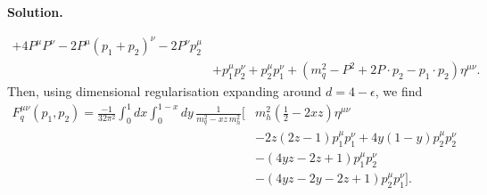 \documentclass[a4paper,11pt]{article}
\newenvironment{solution}{\par\medskip\noindent\textbf{Solution.}\par\smallskip}{\par\medskip}
\begin{document}
\begin{solution}
\begin{equation}
\begin{aligned}
+4P^\mu P^\nu
-2P^\mu(p_1+p_2)^\nu
-2P^\nu p_2^\mu
\\
&+p_1^\mu p_2^\nu+p_2^\mu p_1^\nu
+\left(
m_q^2-P^2+2P\cdot p_2-p_1\cdot p_2
\right)\eta^{\mu\nu}.
\end{aligned}
\end{equation}
Then, using dimensional regularisation expanding around $d=4-\epsilon$, we find
\begin{equation}
\begin{aligned}
F_q^{\mu\nu}(p_1,p_2)
=
\frac{-1}{32\pi^2}
\int_0^1dx\int_0^{1-x}dy\,
\frac{1}{m_q^2-xz\,m_h^2}
\Bigg[
&m_h^2\left(\frac12-2xz\right)\eta^{\mu\nu}
\\
&-2z(2z-1)p_1^\mu p_1^\nu
+4y(1-y)p_2^\mu p_2^\nu
\\
&-\left(4yz-2z+1\right)p_1^\mu p_2^\nu
\\
&-\left(4yz-2y-2z+1\right)p_2^\mu p_1^\nu
\Bigg].
\end{aligned}
\end{equation}


\end{solution}
\end{document}
